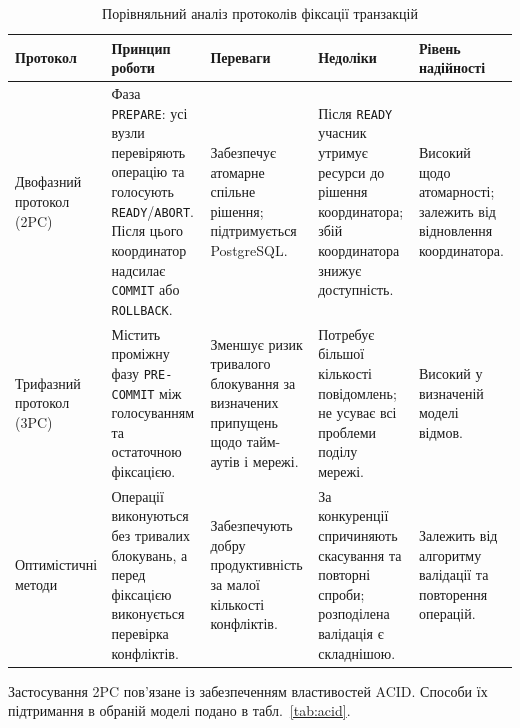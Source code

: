\begin{table}[htbp]
\centering
\caption{Порівняльний аналіз протоколів фіксації транзакцій}
\label{tab:protocols}
\fontsize{10pt}{12pt}\selectfont
\setlength{\tabcolsep}{3pt}
\renewcommand{\arraystretch}{1.16}
\begin{tabularx}{\textwidth}{|>{\RaggedRight\arraybackslash}p{}|
                               Y|Y|Y|
                               >{\RaggedRight\arraybackslash}p{0.14\textwidth}|}
\hline
\textbf{Протокол} & \textbf{Принцип роботи} & \textbf{Переваги} & \textbf{Недоліки} & \textbf{Рівень надійності} \\
\hline
Двофазний протокол (2PC) &
Фаза \texttt{PREPARE}: усі вузли перевіряють операцію та голосують \texttt{READY}/\texttt{ABORT}. Після цього координатор надсилає \texttt{COMMIT} або \texttt{ROLLBACK}. &
Забезпечує атомарне спільне рішення; підтримується PostgreSQL. &
Після \texttt{READY} учасник утримує ресурси до рішення координатора; збій координатора знижує доступність. &
Високий щодо атомарності; залежить від відновлення координатора. \\
\hline
Трифазний протокол (3PC) &
Містить проміжну фазу \texttt{PRE-COMMIT} між голосуванням та остаточною фіксацією. &
Зменшує ризик тривалого блокування за визначених припущень щодо тайм-аутів і мережі. &
Потребує більшої кількості повідомлень; не усуває всі проблеми поділу мережі. &
Високий у визначеній моделі відмов. \\
\hline
Оптимістичні методи &
Операції виконуються без тривалих блокувань, а перед фіксацією виконується перевірка конфліктів. &
Забезпечують добру продуктивність за малої кількості конфліктів. &
За конкуренції спричиняють скасування та повторні спроби; розподілена валідація є складнішою. &
Залежить від алгоритму валідації та повторення операцій. \\
\hline
\end{tabularx}
\end{table}

Застосування 2PC пов'язане із забезпеченням властивостей ACID. Способи їх підтримання в обраній моделі подано в табл.~\ref{tab:acid}.

